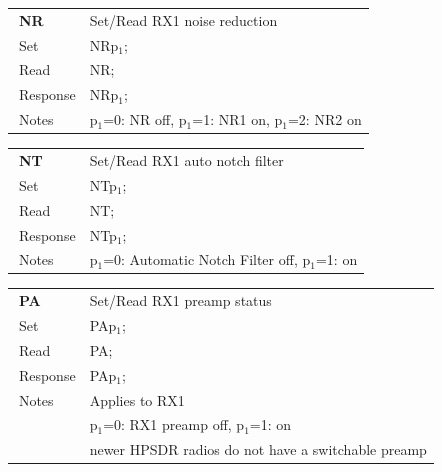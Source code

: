 \documentclass[12pt]{book}
\begin{document}
\begin{center}
\begin{tabular}{|p{2cm}|p{11cm}|}
\toprule
$\phantom{\Big|}$\textbf{\large NR} & Set/Read RX1 noise reduction \\\cline{1-2}
$\phantom{\Big|}${\large Set} & {NRp$_1$;} \\\hline
$\phantom{\Big|}${\large Read} & {NR;} \\\hline
$\phantom{\Big|}${\large Response} & {NRp$_1$;} \\\hline
$\phantom{\Big|}${\large Notes} & \multicolumn{1}{|p{11cm}|}{p$_1$=0: NR off, p$_1$=1: NR1 on, p$_1$=2: NR2 on} \\
\bottomrule
\end{tabular}
\end{center}

\begin{center}
\begin{tabular}{|p{2cm}|p{11cm}|}
\toprule
$\phantom{\Big|}$\textbf{\large NT} & Set/Read RX1 auto notch filter \\\cline{1-2}
$\phantom{\Big|}${\large Set} & {NTp$_1$;} \\\hline
$\phantom{\Big|}${\large Read} & {NT;} \\\hline
$\phantom{\Big|}${\large Response} & {NTp$_1$;} \\\hline
$\phantom{\Big|}${\large Notes} & \multicolumn{1}{|p{11cm}|}{p$_1$=0: Automatic Notch Filter off, p$_1$=1: on} \\
\bottomrule
\end{tabular}
\end{center}

\begin{center}
\begin{tabular}{|p{2cm}|p{11cm}|}
\toprule
$\phantom{\Big|}$\textbf{\large PA} & Set/Read RX1 preamp status \\\cline{1-2}
$\phantom{\Big|}${\large Set} & {PAp$_1$;} \\\hline
$\phantom{\Big|}${\large Read} & {PA;} \\\hline
$\phantom{\Big|}${\large Response} & {PAp$_1$;} \\\hline
$\phantom{\Big|}${\large Notes} & \multicolumn{1}{|p{11cm}|}{Applies to RX1} \\
 & \multicolumn{1}{|p{11cm}|}{p$_1$=0: RX1 preamp off, p$_1$=1: on} \\
 & \multicolumn{1}{|p{11cm}|}{newer HPSDR radios do not have a switchable preamp} \\
\bottomrule
\end{tabular}
\end{center}
\end{document}
